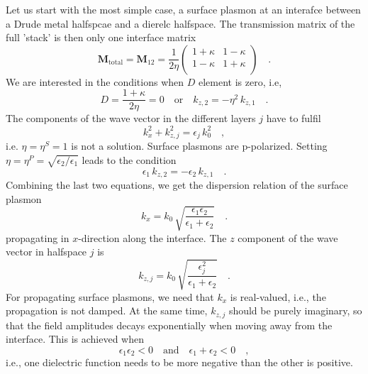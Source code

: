 Let us start with the most simple case, a surface plasmon at an interafce between a Drude metal halfspcae and a dierelc halfspace. The transmission matrix of the full 'stack' is then only one interface matrix
\begin{equation}
\mathbf{M}_\text{total} = \mathbf{M}_{12} =\frac{ 1}{2 \eta }
\begin{pmatrix}
1 + \kappa & 1  -\kappa \\  1  - \kappa  & 1 + \kappa \\
\end{pmatrix}  \quad .
\end{equation}
We are interested in the conditions when  $D$ element is zero, i.e,
\begin{equation}
D = \frac{1 + \kappa}{2 \eta} = 0 \quad \text{or} \quad
k_{z,2} = - \eta^2 \, k_{z,1} \quad .
\end{equation}
The components of the wave vector in the different layers $j$ have to fulfil
\begin{equation}
 k_x^2 + k_{z, j}^2 = \epsilon_j \, k_0^2 \quad , 
\end{equation}
i.e. $\eta = \eta^S = 1$ is not a solution. Surface plasmons are p-polarized. Setting $\eta = \eta^P = \sqrt{\epsilon_2 / \epsilon_1}$  leads to the condition
\begin{equation}
\epsilon_1 \, k_{z,2} = - \epsilon_2 \, k_{z,1} \quad . \label{eq:surface_spp_condition_kz}
\end{equation}
Combining the last two equations, we get the dispersion relation of the surface plasmon
\begin{equation}
k_x = k_0 \, \sqrt{\frac{\epsilon_1 \epsilon_2}{\epsilon_1 + \epsilon_2}} \quad . \label{eq:surface_spp_dispersion}
\end{equation}
propagating in $x$-direction along the interface. The $z$ component of the wave vector in halfspace $j$ is
\begin{equation}
k_{z,j} = k_0 \, \sqrt{\frac{\epsilon_j^2}{\epsilon_1 + \epsilon_2}} \quad .
\end{equation}
For propagating surface plasmons, we need that $k_x$ is real-valued, i.e., the propagation is not damped. At the same time, $k_{z,j}$ should be purely imaginary, so that the field amplitudes decays exponentially when moving away from the interface. This is achieved when
\begin{equation}
 \epsilon_1 \epsilon_2 < 0 \quad \text{and} \quad 
  \epsilon_1 + \epsilon_2 < 0 \quad,
\end{equation}
i.e., one dielectric function needs to be more negative than the other is positive.


